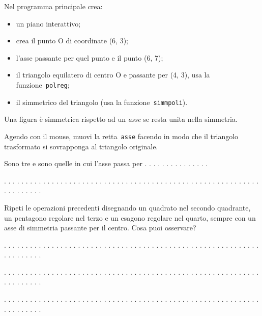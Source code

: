 Nel programma principale crea:
\begin{itemize} [noitemsep]
\item un piano interattivo;
\item crea il punto O di coordinate (6, 3);
\item l'asse passante per quel punto e il punto (6, 7);
\item il triangolo equilatero di centro O e passante per (4, 3), usa la
funzione~\lstinline{polreg};
\item il simmetrico del triangolo (usa la funzione~\lstinline{simmpoli}).

\end{itemize}

Una figura è simmetrica rispetto ad un \emph{asse} se resta unita nella 
simmetria.

Agendo con il mouse, muovi la retta~\lstinline{asse} facendo in modo che il 
triangolo trasformato si sovrapponga al triangolo originale.

Sono tre e sono quelle in cui l'asse passa per . . . . . . . . . . . . . . .

. . . . . . . . . . . . . . . . . . . . . . . . . . . . . . . . . . . . . . . .
. . . . . . . . . . . . . . . . . . . . . . . . . . . .

Ripeti le operazioni precedenti disegnando un quadrato nel secondo quadrante,
un pentagono regolare nel terzo e un esagono regolare nel quarto,
sempre con un asse di simmetria passante per il centro.
Cosa puoi osservare?

. . . . . . . . . . . . . . . . . . . . . . . . . . . . . . . . . . . . . . . .
. . . . . . . . . . . . . . . . . . . . . . . . . . . .

. . . . . . . . . . . . . . . . . . . . . . . . . . . . . . . . . . . . . . . .
. . . . . . . . . . . . . . . . . . . . . . . . . . . .

. . . . . . . . . . . . . . . . . . . . . . . . . . . . . . . . . . . . . . . .
. . . . . . . . . . . . . . . . . . . . . . . . . . . .

